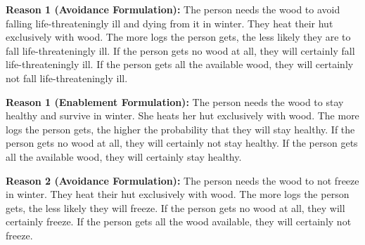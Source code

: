 \documentclass[egregdoesnotlikesansseriftitles]{scrartcl}
\begin{document}
\noindent\textbf{Reason 1 (Avoidance Formulation):} The person needs the wood to avoid falling life-threateningly ill and dying from it in winter. %
They heat their hut exclusively with wood. %
The more logs the person gets, the less likely they are to fall life-threateningly ill. %
If the person gets no wood at all, they will certainly fall life-threateningly ill. %
If the person gets all the available wood, they will certainly not fall life-threateningly ill.\vspace{2ex} %

\noindent\textbf{Reason 1 (Enablement Formulation):} The person needs the wood to stay healthy and survive in winter. %
She heats her hut exclusively with wood. %
The more logs the person gets, the higher the probability that they will stay healthy. %
If the person gets no wood at all, they will certainly not stay healthy. %
If the person gets all the available wood, they will certainly stay healthy.\vspace{2ex} %

\noindent\textbf{Reason 2 (Avoidance Formulation):} The person needs the wood to not freeze in winter. %
They heat their hut exclusively with wood. %
The more logs the person gets, the less likely they will freeze. %
If the person gets no wood at all, they will certainly freeze. %
If the person gets all the wood available, they will certainly not freeze.\vspace{2ex} %
\end{document}
